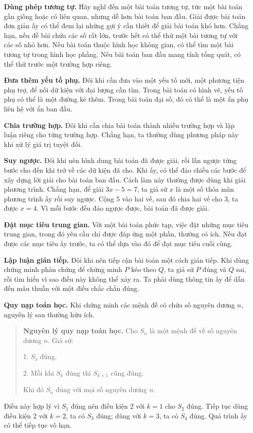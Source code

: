\documentclass[12pt,a4paper]{article}
\begin{document}
\noindent\textbf{Dùng phép tương tự.} Hãy nghĩ đến một bài toán tương tự, tức một bài toán gần giống hoặc có liên quan, nhưng dễ hơn bài toán ban đầu. Giải được bài toán đơn giản ấy có thể đem lại những gợi ý cần thiết để giải bài toán khó hơn. Chẳng hạn, nếu đề bài chứa các số rất lớn, trước hết có thể thử một bài tương tự với các số nhỏ hơn. Nếu bài toán thuộc hình học không gian, có thể tìm một bài tương tự trong hình học phẳng. Nếu bài toán ban đầu mang tính tổng quát, có thể thử trước một trường hợp riêng.

\noindent\textbf{Đưa thêm yếu tố phụ.} Đôi khi cần đưa vào một yếu tố mới, một phương tiện phụ trợ, để nối dữ kiện với đại lượng cần tìm. Trong bài toán có hình vẽ, yếu tố phụ có thể là một đường kẻ thêm. Trong bài toán đại số, đó có thể là một ẩn phụ liên hệ với ẩn ban đầu.

\noindent\textbf{Chia trường hợp.} Đôi khi cần chia bài toán thành nhiều trường hợp và lập luận riêng cho từng trường hợp. Chẳng hạn, ta thường dùng phương pháp này khi xử lý giá trị tuyệt đối.

\noindent\textbf{Suy ngược.} Đôi khi nên hình dung bài toán đã được giải, rồi lần ngược từng bước cho đến khi trở về các dữ kiện đã cho. Khi ấy, có thể đảo chiều các bước để xây dựng lời giải cho bài toán ban đầu. Cách làm này thường được dùng khi giải phương trình. Chẳng hạn, để giải $3x-5=7$, ta giả sử $x$ là một số thỏa mãn phương trình ấy rồi suy ngược. Cộng 5 vào hai vế, sau đó chia hai vế cho 3, ta được $x=4$. Vì mỗi bước đều đảo ngược được, bài toán đã được giải.

\noindent\textbf{Đặt mục tiêu trung gian.} Với một bài toán phức tạp, việc đặt những mục tiêu trung gian, trong đó yêu cầu chỉ được đáp ứng một phần, thường có ích. Nếu đạt được các mục tiêu ấy trước, ta có thể dựa vào đó để đạt mục tiêu cuối cùng.

\noindent\textbf{Lập luận gián tiếp.} Đôi khi nên tiếp cận bài toán một cách gián tiếp. Khi dùng chứng minh phản chứng để chứng minh $P$ kéo theo $Q$, ta giả sử $P$ đúng và $Q$ sai, rồi tìm hiểu vì sao điều này không thể xảy ra. Ta phải dùng thông tin ấy để dẫn đến mâu thuẫn với một điều chắc chắn đúng.

\noindent\textbf{Quy nạp toán học.} Khi chứng minh các mệnh đề có chứa số nguyên dương $n$, nguyên lý sau thường hữu ích.
\begin{quote}
\textbf{Nguyên lý quy nạp toán học.} Cho $S_n$ là một mệnh đề về số nguyên dương $n$. Giả sử:

1. $S_1$ đúng.

2. Mỗi khi $S_k$ đúng thì $S_{k+1}$ cũng đúng.

Khi đó $S_n$ đúng với mọi số nguyên dương $n$.
\end{quote}
Điều này hợp lý vì $S_1$ đúng nên điều kiện 2 với $k=1$ cho $S_2$ đúng. Tiếp tục dùng điều kiện 2 với $k=2$, ta có $S_3$ đúng; dùng với $k=3$, ta có $S_4$ đúng. Quá trình ấy có thể tiếp tục vô hạn.
\end{document}
